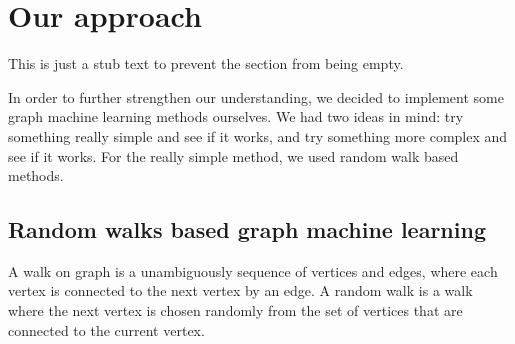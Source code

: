 \section{Our approach}
This is just a stub text to prevent the section from being empty.

In order to further strengthen our understanding, we decided to implement some graph machine learning methods ourselves.
We had two ideas in mind: try something really simple and see if it works, and try something more complex and see if it works.
For the really simple method, we used random walk based methods.

\subsection{Random walks based graph machine learning}

A walk on graph is a unambiguously sequence of vertices and edges, where each vertex is connected to the next vertex by an edge.
A random walk is a walk where the next vertex is chosen randomly from the set of vertices that are connected to the current vertex.